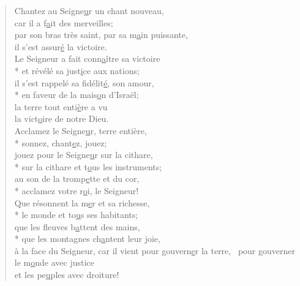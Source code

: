 
\begin{verse}
Chantez au Seigne\underline{u}r un chant nouveau, \\
car il a f\underline{a}it des merveilles; \\
par son bras très saint, par sa m\underline{a}in puissante, \\
il s’est assur\underline{é} la victoire. \\

Le Seigneur a fait conn\underline{a}ître sa victoire \\*
et révélé sa just\underline{i}ce aux nations; \\
il s’est rappelé sa fidélit\underline{é}, son amour, \\*
en faveur de la mais\underline{o}n d’Israël; \\
la terre tout enti\underline{è}re a vu \\
la vict\underline{o}ire de notre Dieu. \\

Acclamez le Seigne\underline{u}r, terre entière, \\*
sonnez, chant\underline{e}z, jouez; \\
jouez pour le Seigne\underline{u}r sur la cithare, \\*
sur la cithare et t\underline{o}us les instruments; \\
au son de la tromp\underline{e}tte et du cor, \\*
acclamez votre r\underline{o}i, le Seigneur! \\

Que résonnent la m\underline{e}r et sa richesse, \\*
le monde et to\underline{u}s ses habitants; \\
que les fleuves b\underline{a}ttent des mains, \\*
que les montagnes ch\underline{a}ntent leur joie, \\
à la face du Seigneur, car il vient
pour gouvern\underline{e}r la terre,~\psalmstar
pour gouverner le m\underline{o}nde avec justice \\
et les pe\underline{u}ples avec droiture! \\
\end{verse}

